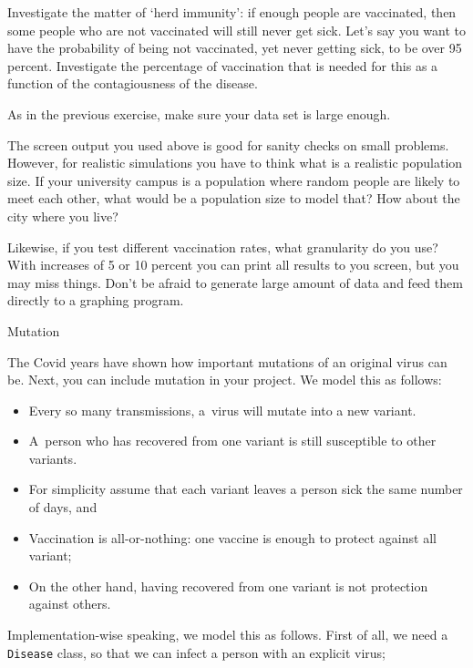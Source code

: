 \begin{exercise}
  Investigate the matter of `herd immunity': if enough people are
  vaccinated, then some people who are not vaccinated will still never get
  sick. Let's say you want to have the probability
  of being not vaccinated, yet never getting sick,
  to be over 95 percent.
  Investigate the percentage of vaccination that is needed
  for this as a function of the contagiousness of the disease.

  As in the previous exercise, make sure your data set is large enough.
\end{exercise}

\begin{remark}
  The screen output you used above is good for sanity checks on small problems.
  However, for realistic simulations you have to think what is a realistic population size.
  If your university campus is a population where random people are likely to meet each other,
  what would be a population size to model that? How about the city where you live?

  Likewise, if you test different vaccination rates, what granularity do you use?
  With increases of 5 or 10 percent you can print all results to you screen,
  but you may miss things. Don't be afraid to generate large amount of data
  and feed them directly to a graphing program.
\end{remark}

 {Mutation}

The Covid years have shown how important mutations of an original virus can be.
Next, you can include mutation in your project. We model this as follows:
\begin{itemize}
\item Every so many transmissions, a~virus will mutate into a new variant.
\item A~person who has recovered from one variant is still susceptible to other variants.
\item For simplicity assume that each variant leaves a person sick the same number of days, and
\item Vaccination is all-or-nothing: one vaccine is enough to protect against all variant;
\item On the other hand, having recovered from one variant is not protection against others.
\end{itemize}

Implementation-wise speaking, we model this as follows.
First of all, we need a \lstinline{Disease} class,
so that we can infect a person with an explicit virus;

